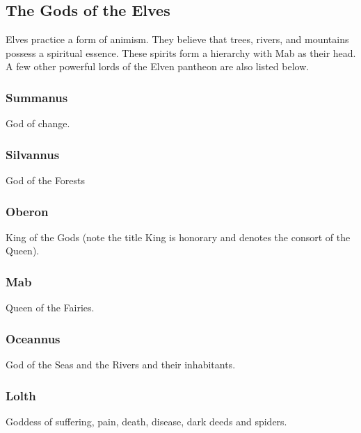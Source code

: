 \documentclass[a4paper]{style/dnd4e}
\begin{document}
\subsection*{The Gods of the Elves}

Elves practice a form of animism.  They believe that trees, rivers, and mountains 
possess a spiritual essence.  These spirits form a hierarchy with Mab as their head.
A few other powerful lords of the Elven pantheon are also listed below.

\subsubsection*{Summanus}
God of change.

\subsubsection*{Silvannus} 
God of the Forests

\subsubsection*{Oberon}
King of the Gods (note the title King is honorary and denotes the consort of the Queen).

\subsubsection*{Mab}  
Queen of the Fairies.

\subsubsection*{Oceannus}  
God of the Seas and the Rivers and their inhabitants.
  
\subsubsection*{Lolth}
Goddess of suffering, pain, death, disease, dark deeds and spiders.
\end{document}
